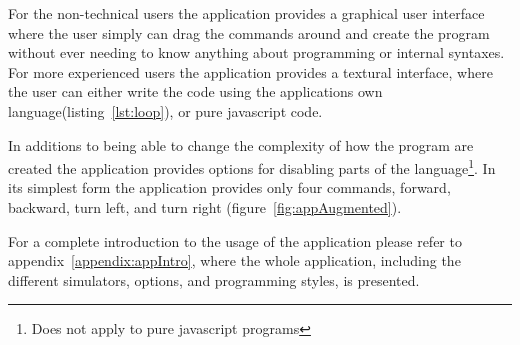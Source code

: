 \bigskip\noindent
For the non-technical users the application provides a graphical user interface where the user simply can drag the commands around and create the program without ever needing to know anything about programming or internal syntaxes. For more experienced users the application provides a textural interface, where the user can either write the code using the applications own language(listing~\ref{lst:loop}), or pure javascript code. 

\bigskip\noindent
In additions to being able to change the complexity of how the program are created the application provides options for disabling parts of the language\footnote{Does not apply to pure javascript programs}. In its simplest form the application provides only four commands, forward, backward, turn left, and turn right (figure~\ref{fig:appAugmented}). 


\bigskip\noindent
For a complete introduction to the usage of the application please refer to appendix~\ref{appendix:appIntro}, where the whole application, including the different simulators, options, and programming styles, is presented.